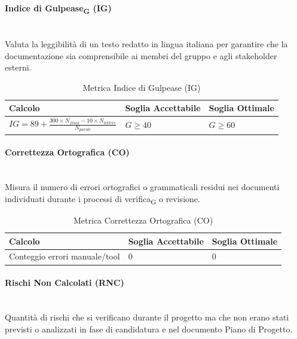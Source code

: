 \documentclass[11pt,a4paper]{article}
\newcommand{\gls}[1]{#1\textsubscript{G}}
\begin{document}
\paragraph{Indice di Gulpease\textsubscript{G} (IG)} \hfill \\
Valuta la leggibilità di un testo redatto in lingua italiana per garantire che la documentazione sia comprensibile ai membri del gruppo e agli stakeholder esterni.

\begin{table}[H]
    \centering
    \renewcommand{\arraystretch}{1.5}
    \begin{tabular}{|M{0.4\textwidth}|M{0.25\textwidth}|M{0.25\textwidth}|}
        \hline
        \textbf{Calcolo} & \textbf{Soglia Accettabile} & \textbf{Soglia Ottimale} \\
        \hline
        $IG = 89 + \frac{300 \times N_{frasi} - 10 \times N_{lettere}}{N_{parole}}$ & $G \ge 40$ & $G \ge 60$ \\
        \hline
    \end{tabular}
    \caption{Metrica Indice di Gulpease (IG)}
\end{table}

\paragraph{Correttezza Ortografica (CO)} \hfill \\
Misura il numero di errori ortografici o grammaticali residui nei documenti individuati durante i processi di \gls{verifica} o revisione.

\begin{table}[H]
    \centering
    \renewcommand{\arraystretch}{1.5}
    \begin{tabular}{|M{0.4\textwidth}|M{0.25\textwidth}|M{0.25\textwidth}|}
        \hline
        \textbf{Calcolo} & \textbf{Soglia Accettabile} & \textbf{Soglia Ottimale} \\
        \hline
        Conteggio errori manuale/tool & 0 & 0 \\
        \hline
    \end{tabular}
    \caption{Metrica Correttezza Ortografica (CO)}
\end{table}

\paragraph{Rischi Non Calcolati (RNC)} \hfill \\
Quantità di rischi che si verificano durante il progetto ma che non erano stati previsti o analizzati in fase di candidatura e nel documento Piano di Progetto.
\end{document}
